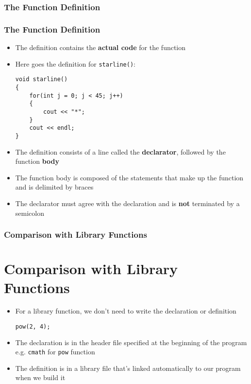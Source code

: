 \documentclass{beamer}
\begin{document}
\begin{frame}[fragile]
    \frametitle{The Function Definition}
    \subsubsection{The Function Definition} %
    \label{ssub:the_function_definition}
    \begin{itemize}
        \item The definition contains the \textbf{actual code} for the function
        \item Here goes the definition for \texttt{starline()}:
        \lstset{style=mystyle}
\begin{lstlisting}
void starline()
{
    for(int j = 0; j < 45; j++)
    {
        cout << "*";
    }
    cout << endl;
}
\end{lstlisting}
        \item The definition consists of a line called the \textbf{declarator}, followed by the function \textbf{body}
        \item The function body is composed of the statements that make up the function and is delimited by braces
        \item The declarator must agree with the declaration and is \textbf{not} terminated by a semicolon
    \end{itemize}
\end{frame}

\begin{frame} [fragile]
    \frametitle{Comparison with Library Functions}
    \section{Comparison with Library Functions} %
    \label{sec:comparison_with_library_functions}
    \begin{itemize}
        \item For a library function, we don't need to write the declaration or definition
        \lstset{style=mystyle}
\begin{lstlisting}
pow(2, 4);
\end{lstlisting}
        \item The declaration is in the header file specified at the beginning of the program e.g. \texttt{cmath} for \texttt{pow} function
        \item The definition is in a library file that's linked automatically to our program when we build it
    \end{itemize}
\end{frame}
\end{document}
